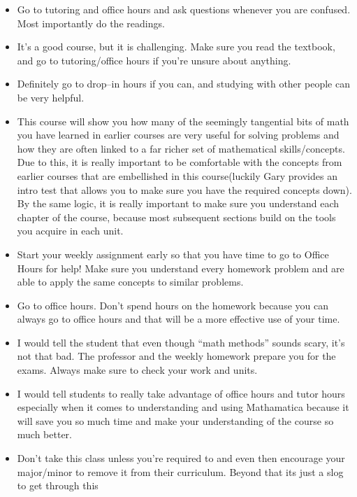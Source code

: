 \documentclass{tufte-handout}
\begin{document}
\begin{itemize}\small
  \item Go to tutoring and office hours and ask questions whenever you
        are confused. Most importantly do the readings.
  \item It's a good course, but it is challenging. Make sure you read
        the textbook, and go to tutoring/office hours if you're unsure
        about anything.
  \item Definitely go to drop--in hours if you can, and studying with
        other people can be very helpful.
  \item This course will show you how many of the seemingly tangential
        bits of math you have learned in earlier courses are very
        useful for solving problems and how they are often linked to a
        far richer set of mathematical skills/concepts. Due to this, it
        is really important to be comfortable with the concepts from
        earlier courses that are embellished in this course(luckily
        Gary provides an intro test that allows you to make sure you
        have the required concepts down). By the same logic, it is
        really important to make sure you understand each chapter of
        the course, because most subsequent sections build on the tools
        you acquire in each unit.
  \item Start your weekly assignment early so that you have time to go
        to Office Hours for help! Make sure you understand every
        homework problem and are able to apply the same concepts to
        similar problems.
  \item Go to office hours. Don't spend hours on the homework because
        you can always go to office hours and that will be a more
        effective use of your time.
  \item I would tell the student that even though ``math methods''
        sounds scary, it's not that bad. The professor and the weekly
        homework prepare you for the exams. Always make sure to check
        your work and units.
  \item I would tell students to really take advantage of office hours
        and tutor hours especially when it comes to understanding and
        using Mathamatica because it will save you so much time and
        make your understanding of the course so much better.
  \item Don't take this class unless you're required to and even then
        encourage your major/minor to remove it from their
        curriculum. Beyond that its just a slog to get through this

\end{itemize}
\end{document}
